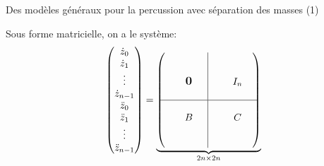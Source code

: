 \begin{frame}{Des modèles généraux pour la percussion avec séparation des masses (1)}

	
	\small
	\vspace*{-0.1cm}
	Sous forme matricielle, on a le système:
	\begin{align} \label{eq:percussion1d4}
    \begin{pmatrix}
        \dot z_0 \\ \dot z_1 \\ \vdots \\ \dot z_{n-1} \\ \ddot z_0 \\ \ddot z_1 \\ \vdots \\ \ddot z_{n-1}
    \end{pmatrix}
    = 
    \underbrace{\begin{pmatrix}
        \begin{matrix}
       & & &  \\ & & &  \\ & & \bigzero & \\ & & & \\      
        \end{matrix}
        & \rvline 
        & \begin{matrix}
        & & & \\ & & &  \\ & & I_n & \\ & & & \\
        \end{matrix}  \\ 
        \hline
        \begin{matrix}
            & & &  \\ & & B & \\ & & & \\ & & & \\     
        \end{matrix}
        & \rvline 
        &\begin{matrix}
            & & & \\ & & C & \\ & & & \\ & & & \\        
        \end{matrix}
      \end{pmatrix}}_{2n \times 2n}

\end{align}
\end{frame}
